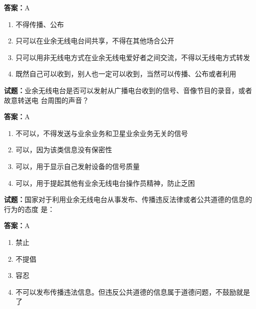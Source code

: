 \documentclass{ctexbook}
\begin{document}
\textbf{答案：}A 

\begin{enumerate}[leftmargin=3em]
  \item 不得传播、公布 

  \item 只可以在业余无线电台间共享，不得在其他场合公开 

  \item 只可以用非无线电方式在业余无线电爱好者之间交流，不得以无线电方式转发 

  \item 既然自己可以收到，别人也一定可以收到，当然可以传播、公布或者利用 

\end{enumerate}





\vspace{1em}

\textbf{试题：}业余无线电台是否可以发射从广播电台收到的信号、音像节目的录音，或者故意转送电
台周围的声音？ 

\textbf{答案：}A 

\begin{enumerate}[leftmargin=3em]
  \item 不可以，不得发送与业余业务和卫星业余业务无关的信号 

  \item 可以，因为该类信息没有保密性 

  \item 可以，用于显示自己发射设备的信号质量 

  \item 可以，用于提起其他有业余无线电台操作员精神，防止乏困 

\end{enumerate}





\vspace{1em}

\textbf{试题：}国家对于利用业余无线电台从事发布、传播违反法律或者公共道德的信息的行为的态度
是： 

\textbf{答案：}A 

\begin{enumerate}[leftmargin=3em]
  \item 禁止 

  \item 不提倡 

  \item 容忍 

  \item 不可以发布传播违法信息。但违反公共道德的信息属于道德问题，不鼓励就是了 

\end{enumerate}
\end{document}
